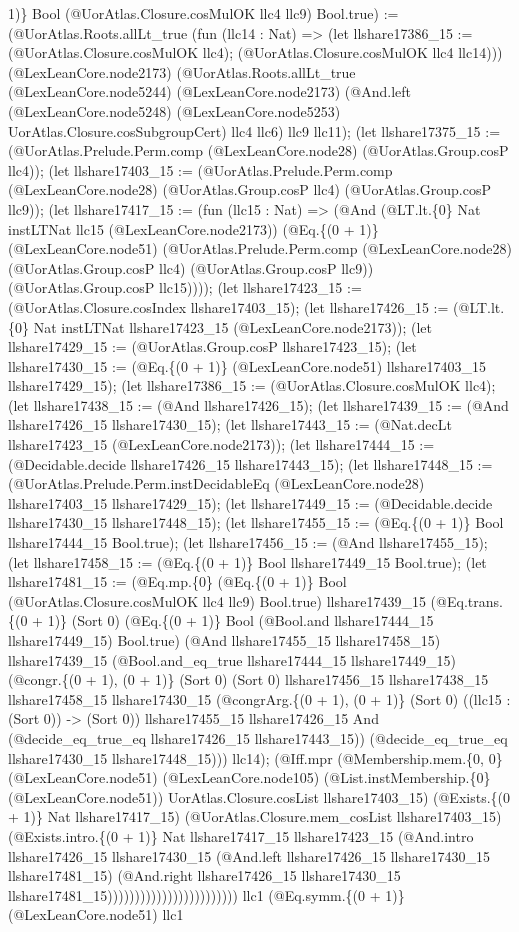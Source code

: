 \documentclass[11pt]{article}
\begin{document}
1)\} Bool (@UorAtlas.Closure.cosMulOK llc4 llc9) Bool.true) := (@UorAtlas.Roots.allLt\_true (fun (llc14 : Nat) => (let llshare17386\_15 := (@UorAtlas.Closure.cosMulOK llc4); (@UorAtlas.Closure.cosMulOK llc4 llc14))) (@LexLeanCore.node2173) (@UorAtlas.Roots.allLt\_true (@LexLeanCore.node5244) (@LexLeanCore.node2173) (@And.left (@LexLeanCore.node5248) (@LexLeanCore.node5253) UorAtlas.Closure.cosSubgroupCert) llc4 llc6) llc9 llc11); (let llshare17375\_15 := (@UorAtlas.Prelude.Perm.comp (@LexLeanCore.node28) (@UorAtlas.Group.cosP llc4)); (let llshare17403\_15 := (@UorAtlas.Prelude.Perm.comp (@LexLeanCore.node28) (@UorAtlas.Group.cosP llc4) (@UorAtlas.Group.cosP llc9)); (let llshare17417\_15 := (fun (llc15 : Nat) => (@And (@LT.lt.\{0\} Nat instLTNat llc15 (@LexLeanCore.node2173)) (@Eq.\{(0 + 1)\} (@LexLeanCore.node51) (@UorAtlas.Prelude.Perm.comp (@LexLeanCore.node28) (@UorAtlas.Group.cosP llc4) (@UorAtlas.Group.cosP llc9)) (@UorAtlas.Group.cosP llc15)))); (let llshare17423\_15 := (@UorAtlas.Closure.cosIndex llshare17403\_15); (let llshare17426\_15 := (@LT.lt.\{0\} Nat instLTNat llshare17423\_15 (@LexLeanCore.node2173)); (let llshare17429\_15 := (@UorAtlas.Group.cosP llshare17423\_15); (let llshare17430\_15 := (@Eq.\{(0 + 1)\} (@LexLeanCore.node51) llshare17403\_15 llshare17429\_15); (let llshare17386\_15 := (@UorAtlas.Closure.cosMulOK llc4); (let llshare17438\_15 := (@And llshare17426\_15); (let llshare17439\_15 := (@And llshare17426\_15 llshare17430\_15); (let llshare17443\_15 := (@Nat.decLt llshare17423\_15 (@LexLeanCore.node2173)); (let llshare17444\_15 := (@Decidable.decide llshare17426\_15 llshare17443\_15); (let llshare17448\_15 := (@UorAtlas.Prelude.Perm.instDecidableEq (@LexLeanCore.node28) llshare17403\_15 llshare17429\_15); (let llshare17449\_15 := (@Decidable.decide llshare17430\_15 llshare17448\_15); (let llshare17455\_15 := (@Eq.\{(0 + 1)\} Bool llshare17444\_15 Bool.true); (let llshare17456\_15 := (@And llshare17455\_15); (let llshare17458\_15 := (@Eq.\{(0 + 1)\} Bool llshare17449\_15 Bool.true); (let llshare17481\_15 := (@Eq.mp.\{0\} (@Eq.\{(0 + 1)\} Bool (@UorAtlas.Closure.cosMulOK llc4 llc9) Bool.true) llshare17439\_15 (@Eq.trans.\{(0 + 1)\} (Sort 0) (@Eq.\{(0 + 1)\} Bool (@Bool.and llshare17444\_15 llshare17449\_15) Bool.true) (@And llshare17455\_15 llshare17458\_15) llshare17439\_15 (@Bool.and\_eq\_true llshare17444\_15 llshare17449\_15) (@congr.\{(0 + 1), (0 + 1)\} (Sort 0) (Sort 0) llshare17456\_15 llshare17438\_15 llshare17458\_15 llshare17430\_15 (@congrArg.\{(0 + 1), (0 + 1)\} (Sort 0) ((llc15 : (Sort 0)) -> (Sort 0)) llshare17455\_15 llshare17426\_15 And (@decide\_eq\_true\_eq llshare17426\_15 llshare17443\_15)) (@decide\_eq\_true\_eq llshare17430\_15 llshare17448\_15))) llc14); (@Iff.mpr (@Membership.mem.\{0, 0\} (@LexLeanCore.node51) (@LexLeanCore.node105) (@List.instMembership.\{0\} (@LexLeanCore.node51)) UorAtlas.Closure.cosList llshare17403\_15) (@Exists.\{(0 + 1)\} Nat llshare17417\_15) (@UorAtlas.Closure.mem\_cosList llshare17403\_15) (@Exists.intro.\{(0 + 1)\} Nat llshare17417\_15 llshare17423\_15 (@And.intro llshare17426\_15 llshare17430\_15 (@And.left llshare17426\_15 llshare17430\_15 llshare17481\_15) (@And.right llshare17426\_15 llshare17430\_15 llshare17481\_15)))))))))))))))))))))))) llc1 (@Eq.symm.\{(0 + 1)\} (@LexLeanCore.node51) llc1 
\end{document}
